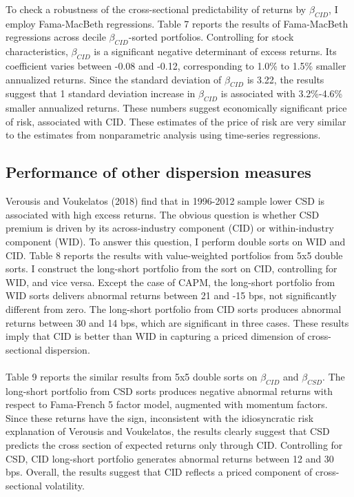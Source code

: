 \documentclass[12pt]{article}
\begin{document}
To check a robustness of the cross-sectional predictability of returns by $\beta_{CID}$, I employ Fama-MacBeth regressions. Table 7 reports the results of Fama-MacBeth regressions across decile $\beta_{CID}$-sorted portfolios. Controlling for stock characteristics, $\beta_{CID}$ is a significant negative determinant of excess returns. Its coefficient varies between -0.08 and -0.12, corresponding to 1.0\% to 1.5\% smaller annualized returns. Since the standard deviation of $\beta_{CID}$ is 3.22, the results suggest that 1 standard deviation increase in $\beta_{CID}$ is associated with 3.2\%-4.6\% smaller annualized returns. These numbers suggest economically significant price of risk, associated with CID. These estimates of the price of risk are very similar to the estimates from nonparametric analysis using time-series regressions.

\subsection{Performance of other dispersion measures}

Verousis and Voukelatos (2018) find that in 1996-2012 sample lower CSD is associated with high excess returns. The obvious question is whether CSD premium is driven by its across-industry component (CID) or within-industry component (WID). To answer this question, I perform double sorts on WID and CID. Table 8 reports the results with value-weighted portfolios from 5x5 double sorts. I construct the long-short portfolio from the sort on CID, controlling for WID, and vice versa. Except the case of CAPM, the long-short portfolio from WID sorts delivers abnormal returns between 21 and -15 bps, not significantly different from zero. The long-short portfolio from CID sorts produces abnormal returns between 30 and 14 bps, which are  significant in three cases. These results imply that CID is better than WID in capturing a priced dimension of cross-sectional dispersion. 
\paragraph{}
Table 9 reports the similar results from 5x5 double sorts on $\beta_{CID}$ and $\beta_{CSD}$. The long-short portfolio from CSD sorts produces negative abnormal returns with respect to Fama-French 5 factor model, augmented with momentum factors. Since these returns have the sign, inconsistent with the idiosyncratic risk explanation of Verousis and Voukelatos, the results clearly suggest that CSD predicts the cross section of expected returns only through CID. Controlling for CSD, CID long-short portfolio generates abnormal returns between 12 and 30 bps. Overall, the results suggest that CID reflects a priced component of cross-sectional volatility.
\end{document}
